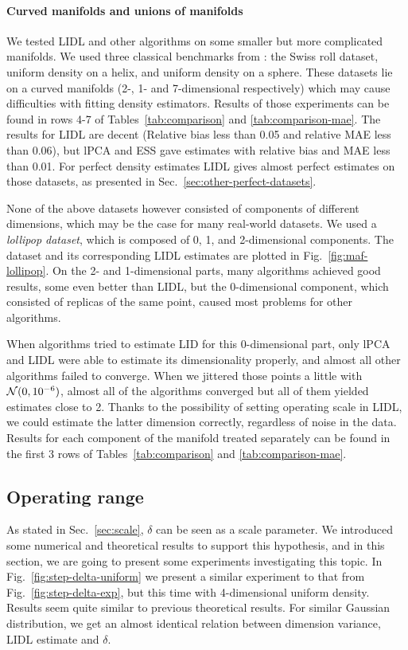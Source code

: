 \paragraph{Curved manifolds and unions of manifolds}

We tested LIDL and other algorithms on some smaller but more complicated manifolds. We used three classical benchmarks from \cite{kleindessner2015dimensionality}: the Swiss roll dataset, uniform density on a helix, and uniform density on a sphere. These datasets lie on a curved manifolds (2-, 1- and 7-dimensional respectively) which may cause difficulties with fitting density estimators. Results of those experiments can be found in rows 4-7 of Tables~\ref{tab:comparison} and \ref{tab:comparison-mae}. The results for LIDL are decent (Relative bias less than 0.05 and relative MAE less than 0.06), but lPCA and ESS gave estimates with relative bias and MAE less than 0.01. For perfect density estimates LIDL gives almost perfect estimates on those datasets, as presented in Sec.~\ref{sec:other-perfect-datasets}.

None of the above datasets however consisted of components of different dimensions, which may be the case for many real-world datasets. We used a \emph{lollipop dataset}, which is composed of 0, 1, and 2-dimensional components. The dataset and its corresponding LIDL estimates are plotted in Fig.~\ref{fig:maf-lollipop}. On the 2- and 1-dimensional parts, many algorithms achieved good results, some even better than LIDL, but the 0-dimensional component, which consisted of replicas of the same point, caused most problems for other algorithms. 

When algorithms tried to estimate LID for this 0-dimensional part, only lPCA and LIDL were able to estimate its dimensionality properly, and almost all other algorithms failed to converge. When we jittered those points a little with $\mathcal{N}(0,10^{-6})$, almost all of the algorithms converged but all of them yielded estimates close to 2. Thanks to the possibility of setting operating scale in LIDL, we could estimate the latter dimension correctly, regardless of noise in the data. Results for each component of the manifold treated separately can be found in the first 3 rows of Tables~\ref{tab:comparison} and \ref{tab:comparison-mae}.

\subsection{Operating range}
\label{sec:operating-range}
As stated in Sec.~\ref{sec:scale}, $\delta$ can be seen as a scale parameter. We introduced some numerical and theoretical results to support this hypothesis, and in this section, we are going to present some experiments investigating this topic. In Fig.~\ref{fig:step-delta-uniform} we present a similar experiment to that from Fig.~\ref{fig:step-delta-exp}, but this time with 4-dimensional uniform density. Results seem quite similar to previous theoretical results. For similar Gaussian distribution, we get an almost identical relation between dimension variance, LIDL estimate and $\delta$.

